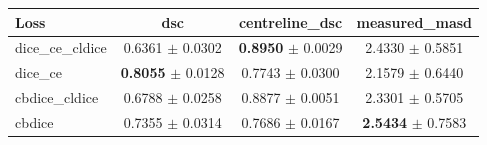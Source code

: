 \begin{tabular}{lccc}
\toprule
Loss & dsc & centreline\_dsc & measured\_masd \\
\midrule
dice\_ce\_cldice & 0.6361 $\pm$ 0.0302 & \textbf{0.8950} $\pm$ 0.0029 & 2.4330 $\pm$ 0.5851 \\
dice\_ce & \textbf{0.8055} $\pm$ 0.0128 & 0.7743 $\pm$ 0.0300 & 2.1579 $\pm$ 0.6440 \\
cbdice\_cldice & 0.6788 $\pm$ 0.0258 & 0.8877 $\pm$ 0.0051 & 2.3301 $\pm$ 0.5705 \\
cbdice & 0.7355 $\pm$ 0.0314 & 0.7686 $\pm$ 0.0167 & \textbf{2.5434} $\pm$ 0.7583 \\
\bottomrule
\end{tabular}
